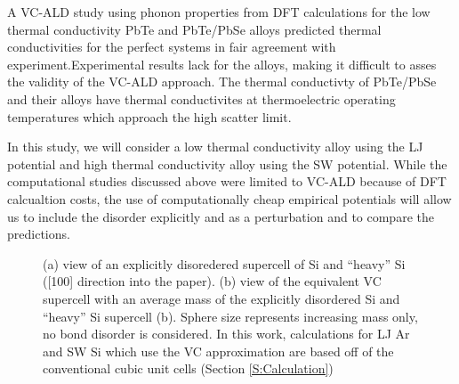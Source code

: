 \documentclass[aps,prb,onecolumn,preprint,superscriptaddress,amsmath,amssymb,floatfix]{revtex4}
\begin{document}
A VC-ALD study using phonon properties from DFT calculations for the 
low thermal conductivity PbTe\cite{shiga_microscopic_2012} 
and PbTe/PbSe alloys\cite{tian_phonon_2012}  
predicted thermal conductivities for the perfect systems 
in fair agreement with experiment.Experimental results lack for the alloys, 
making it difficult to asses the validity of the VC-ALD approach.
\cite{kudman_thermoelectric_1972,pei_convergence_2011}  
The thermal conductivty 
of PbTe/PbSe and their alloys have thermal conductivites at thermoelectric 
operating temperatures which approach the high scatter limit.
\cite{kudman_thermoelectric_1972,pei_convergence_2011,
tian_phonon_2012,koh_lattice_2009} 

In this study, we will consider a low thermal conductivity alloy  
using the LJ potential and high thermal conductivity alloy using the 
SW potential. While the computational studies discussed above were 
limited to VC-ALD 
because of DFT calcualtion costs, the use of computationally 
cheap empirical potentials will allow us to include the disorder 
explicitly and as a perturbation and to compare the predictions. 


\begin{figure}
\begin{center}
\mbox{}
\vspace*{0mm}
\end{center}
\caption{\label{F:supercells} 
(a) view of an explicitly disoredered supercell of 
Si and ``heavy'' Si ([100] direction into the paper).
\cite{momma_vesta:_2008} 
(b) view of the equivalent VC supercell 
with an average
mass of the explicitly disordered Si and ``heavy'' Si supercell 
(b). 
Sphere size represents 
increasing mass 
only, no bond disorder is considered. 
In this work, calculations for LJ Ar and SW Si which use the VC 
approximation 
are based off of the conventional cubic unit cells 
(Section \ref{S:Calculation}) 
}
\end{figure}
\end{document}
